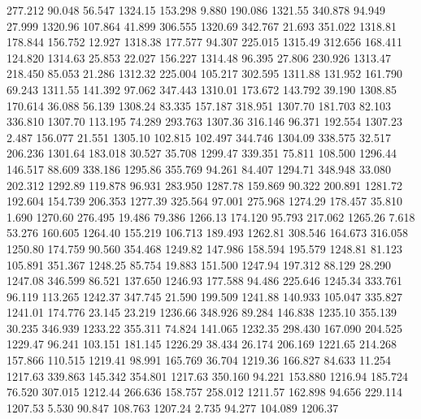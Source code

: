  277.212   90.048   56.547      1324.15
 153.298    9.880  190.086      1321.55
 340.878   94.949   27.999      1320.96
 107.864   41.899  306.555      1320.69
 342.767   21.693  351.022      1318.81
 178.844  156.752   12.927      1318.38
 177.577   94.307  225.015      1315.49
 312.656  168.411  124.820      1314.63
  25.853   22.027  156.227      1314.48
  96.395   27.806  230.926      1313.47
 218.450   85.053   21.286      1312.32
 225.004  105.217  302.595      1311.88
 131.952  161.790   69.243      1311.55
 141.392   97.062  347.443      1310.01
 173.672  143.792   39.190      1308.85
 170.614   36.088   56.139      1308.24
  83.335  157.187  318.951      1307.70
 181.703   82.103  336.810      1307.70
 113.195   74.289  293.763      1307.36
 316.146   96.371  192.554      1307.23
   2.487  156.077   21.551      1305.10
 102.815  102.497  344.746      1304.09
 338.575   32.517  206.236      1301.64
 183.018   30.527   35.708      1299.47
 339.351   75.811  108.500      1296.44
 146.517   88.609  338.186      1295.86
 355.769   94.261   84.407      1294.71
 348.948   33.080  202.312      1292.89
 119.878   96.931  283.950      1287.78
 159.869   90.322  200.891      1281.72
 192.604  154.739  206.353      1277.39
 325.564   97.001  275.968      1274.29
 178.457   35.810    1.690      1270.60
 276.495   19.486   79.386      1266.13
 174.120   95.793  217.062      1265.26
   7.618   53.276  160.605      1264.40
 155.219  106.713  189.493      1262.81
 308.546  164.673  316.058      1250.80
 174.759   90.560  354.468      1249.82
 147.986  158.594  195.579      1248.81
  81.123  105.891  351.367      1248.25
  85.754   19.883  151.500      1247.94
 197.312   88.129   28.290      1247.08
 346.599   86.521  137.650      1246.93
 177.588   94.486  225.646      1245.34
 333.761   96.119  113.265      1242.37
 347.745   21.590  199.509      1241.88
 140.933  105.047  335.827      1241.01
 174.776   23.145   23.219      1236.66
 348.926   89.284  146.838      1235.10
 355.139   30.235  346.939      1233.22
 355.311   74.824  141.065      1232.35
 298.430  167.090  204.525      1229.47
  96.241  103.151  181.145      1226.29
  38.434   26.174  206.169      1221.65
 214.268  157.866  110.515      1219.41
  98.991  165.769   36.704      1219.36
 166.827   84.633   11.254      1217.63
 339.863  145.342  354.801      1217.63
 350.160   94.221  153.880      1216.94
 185.724   76.520  307.015      1212.44
 266.636  158.757  258.012      1211.57
 162.898   94.656  229.114      1207.53
   5.530   90.847  108.763      1207.24
   2.735   94.277  104.089      1206.37
